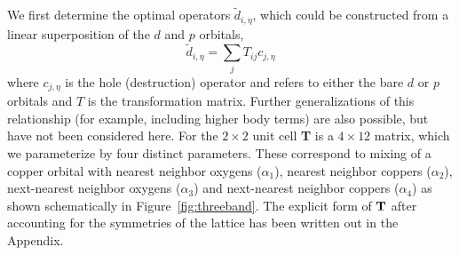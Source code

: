 We first determine the optimal operators $\tilde{d}_{i,\eta}$, which could be constructed from a linear superposition of the $d$ and $p$ orbitals, 
\begin{equation}
	\tilde{d}_{i,\eta} = \sum_{j} T_{ij} c_{j,\eta}
\label{eq:dc}
\end{equation}
where $c_{j,\eta}$ is the hole (destruction) operator and refers to either the bare $d$ or $p$ orbitals and $T$ is the transformation matrix. 
Further generalizations of this relationship (for example, including higher body terms) are also possible, but have not been considered here. 
For the $2\times2$ unit cell {\bf T} is a $4 \times 12 $ matrix, which we parameterize by 
four distinct parameters. These correspond to mixing of a copper orbital 
with nearest neighbor oxygens ($\alpha_1$), nearest neighbor coppers ($\alpha_2$), next-nearest neighbor oxygens ($\alpha_3$) 
and next-nearest neighbor coppers ($\alpha_4$) as shown schematically in Figure~\ref{fig:threeband}. 
The explicit form of ${\bf T}$ after accounting for the symmetries of the 
lattice has been written out in the Appendix. %

